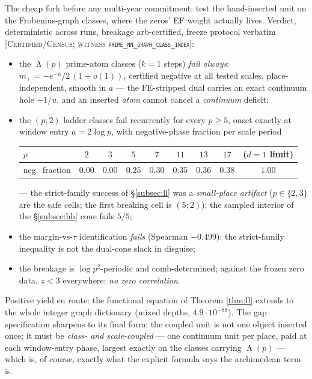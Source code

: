 \documentclass[11pt,reqno]{amsart}
\theoremstyle{plain}
\theoremstyle{definition}
\theoremstyle{remark}
\newcommand{\grade}[1]{\textup{[\textsc{#1}]}}
\DeclareMathOperator{\Lam}{\Lambda}
\begin{document}
The cheap fork before any multi-year commitment: test the hand-inserted unit on the
Frobenius-graph classes, where the zeros' EF weight actually lives. Verdict, deterministic
across runs, breakage arb-certified, freeze protocol verbatim
\grade{Certified/Census; witness \texttt{prime\_\allowbreak nn\_\allowbreak graph\_\allowbreak class\_\allowbreak index}}:
\begin{itemize}
\item the $\Lam(p)$ prime-atom classes ($k = 1$ steps) \emph{fail always}:
$m_+ = -e^{-a}/2\,(1 + o(1))$, certified negative at all tested scales, place-independent,
smooth in $a$ --- the FE-stripped dual carries an exact continuum hole $-1/u$, and an
inserted \emph{atom} cannot cancel a \emph{continuum} deficit;
\item the $(p; 2)$ ladder classes fail recurrently for every $p \ge 5$, onset exactly at
window entry $a = 2\log p$, with negative-phase fraction per scale period
\begin{center}
\small
\begin{tabular}{lcccccccc}
\toprule
$p$ & $2$ & $3$ & $5$ & $7$ & $11$ & $13$ & $17$ & ($d{=}1$ limit) \\
\midrule
neg.\ fraction & $0.00$ & $0.00$ & $0.25$ & $0.30$ & $0.35$ & $0.36$ & $0.38$ & $1.00$ \\
\bottomrule
\end{tabular}
\end{center}
--- the strict-family success of \S\ref{subsec:ll} was a \emph{small-place artifact}
($p \in \{2, 3\}$ are the safe cells; the first breaking cell is $(5; 2)$); the sampled
interior of the \S\ref{subsec:hh} cone fails $5/5$;
\item the margin-vs-$\tau$ identification \emph{fails} (Spearman $-0.499$): the
strict-family inequality is not the dual-cone slack in disguise;
\item the breakage is $\log p^2$-periodic and comb-determined; against the frozen zero data,
$z < 3$ everywhere: \emph{no zero correlation}.
\end{itemize}
Positive yield en route: the functional equation of Theorem \ref{thm:ll} extends to the whole
integer graph dictionary (mixed depths, $4.9\cdot10^{-88}$). The gap specification sharpens
to its final form: the coupled unit is not one object inserted once; it must be
\emph{class- and scale-coupled} --- one continuum unit per place, paid at each window-entry
phase, largest exactly on the classes carrying $\Lam(p)$ --- which is, of course, exactly
what the explicit formula says the archimedean term is.
\end{document}

